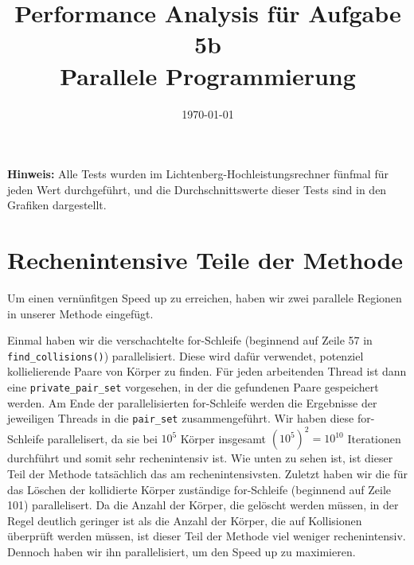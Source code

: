 \documentclass[
  ngerman,
  color=8c,
  submission,
  boxarc,
  fleqn,
]{rubos-tuda-template}
\date{\today}
\begin{document}
\title[Parallele Programmierung]{Performance Analysis für Aufgabe 5b\\ Parallele Programmierung}

\maketitle{}
\textbf{Hinweis:} Alle Tests wurden im Lichtenberg-Hochleistungsrechner fünfmal für jeden Wert durchgeführt, und die Durchschnittswerte dieser Tests sind in den Grafiken dargestellt.

\section{Rechenintensive Teile der Methode}
Um einen vernünfitgen Speed up zu erreichen, haben wir zwei parallele Regionen in unserer Methode eingefügt. 

Einmal haben wir die verschachtelte for-Schleife (beginnend auf Zeile 57 in \verb|find_collisions()|) parallelisiert. Diese wird dafür verwendet, potenziel kollielierende Paare von Körper zu finden. Für jeden arbeitenden Thread ist dann eine \verb|private_pair_set| vorgesehen, in der die gefundenen Paare gespeichert werden. Am Ende der parallelisierten for-Schleife werden die Ergebnisse der jeweiligen Threads in die \verb|pair_set| zusammengeführt. Wir haben diese for-Schleife parallelisert, da sie bei $10^5$ Körper insgesamt $(10^5)^2 = 10^{10}$ Iterationen durchführt und somit sehr rechenintensiv ist. Wie unten zu sehen ist, ist dieser Teil der Methode tatsächlich das am rechenintensivsten. 
Zuletzt haben wir die für das Löschen der kollidierte Körper zuständige for-Schleife (beginnend auf Zeile 101) parallelisert. Da die Anzahl der Körper, die gelöscht werden müssen, in der Regel deutlich geringer ist als die Anzahl der Körper, die auf Kollisionen überprüft werden müssen, ist dieser Teil der Methode viel weniger rechenintensiv. Dennoch haben wir ihn parallelisiert, um den Speed up zu maximieren. \newline
\end{document}
